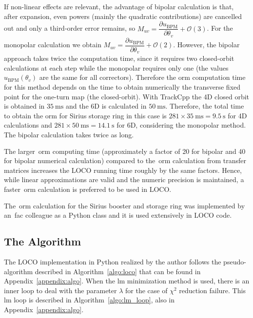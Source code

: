 If non-linear effects are relevant, the advantage of bipolar calculation is that, after expansion, even powers (mainly the quadratic contributions) are cancelled out and only a third-order error remains, so $M_{uv} = \dfrac{\partial u_{\mathrm{BPM}}}{\partial \theta_v} + \mathcal{O}(3)$. For the monopolar calculation we obtain $M_{uv} = \dfrac{\partial u_{\mathrm{BPM}}}{\partial \theta_v} + \mathcal{O}(2)$. However, the bipolar approach takes twice the computation time, since it requires two closed-orbit calculations at each step while the monopolar requires only one (the values $u_{\mathrm{BPM}}\left(\theta_v \right)$ are the same for all correctors). Therefore the \gls{orm} computation time for this method depends on the time to obtain numerically the transverse fixed point for the one-turn map (the closed-orbit). With TrackCpp the 4D closed orbit is obtained in $\SI{35}{\milli\second}$ and the 6D is calculated in $\SI{50}{\milli\second}$. Therefore, the total time to obtain the \gls{orm} for Sirius storage ring in this case is $281 \times \SI{35}{\milli\second} = \SI{9.5}{\second}$ for 4D calculations and $281 \times \SI{50}{\milli\second} = \SI{14.1}{\second}$ for 6D, considering the monopolar method. The bipolar calculation takes twice as long.

The larger~\gls{orm} computing time (approximately a factor of 20 for bipolar and 40 for bipolar numerical calculation) compared to the~\gls{orm} calculation from transfer matrices increases the LOCO running time roughly by the same factors. Hence, while linear approximations are valid and the numeric precision is maintained, a faster~\gls{orm} calculation is preferred to be used in LOCO.

The~\gls{orm} calculation for the Sirius booster and storage ring was implemented by an~\gls{fac} colleague as a Python class and it is used extensively in LOCO code.
\subsection{The Algorithm}
The LOCO implementation in Python realized by the author follows the pseudo-algorithm described in Algorithm~\ref{algo:loco} that can be found in Appendix~\ref{appendix:algo}. When the \gls{lm} minimization method is used, there is an inner loop to deal with the parameter $\lambda$ for the case of $\chi^2$ reduction failure. This \gls{lm} loop is described in Algorithm~\ref{algo:lm_loop}, also in Appendix~\ref{appendix:algo}.

